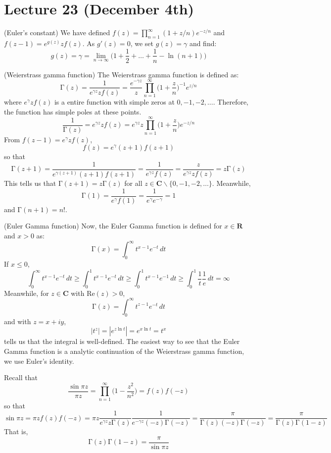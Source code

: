 \section{Lecture 23 (December 4th)}
\begin{recall}
(Euler's constant) We have defined $f(z)=\prod^{\infty }_{n=1}(1+z/n)e^{-z/n}$ and $f(z-1)=e^{g(z)}zf(z)$. As $g'(z)=0$, we set $g(z)=\gamma $ and find:
\[g(z)=\gamma =\lim _{n\rightarrow \infty }\Big(1+\dfrac{1}{2}+\ldots +\dfrac{1}{n}-\ln(n+1)\Big)\]
\end{recall}
\vspace{2ex}
\begin{defi}
(Weierstrass gamma function) The Weierstrass gamma function is defined as:
\[\mathrm{\Gamma}(z)=\dfrac{1}{e^{\gamma z }zf(z)}=\dfrac{e^{-\gamma z}}{z}\prod^{\infty }_{n=1}\Big(1+\dfrac{z}{n}\Big)^{-1}e^{z/n}\]
where $e^{\gamma }zf(z)$ is a entire function with simple zeros at $0,-1,-2,\ldots $. Therefore, the function has simple poles at these points. 
\[\dfrac{1}{\mathrm{\Gamma} (z)}=e^{\gamma z}zf(z)=e^{\gamma z}z\prod^{\infty }_{n=1}\Big(1+\dfrac{z}{n}\Big)e^{-z/n}\]
From $f(z-1)=e^{\gamma }zf(z)$,
\[f(z)=e^{\gamma }(z+1)f(z+1)\]
so that 
\[\mathrm{\Gamma} (z+1)=\dfrac{1}{e^{\gamma (z+1)}(z+1)f(z+1)}=\dfrac{1}{e^{\gamma z}f(z)}=\dfrac{z}{e^{\gamma z}zf(z)}=z\mathrm{\Gamma} (z)\]
This tells us that $\mathrm{\Gamma} (z+1)=z\mathrm{\Gamma} (z)$ for all $z\in {\bm C}\backslash \{0,-1,-2,\ldots \}$. Meanwhile,
\[\mathrm{\Gamma} (1)=\dfrac{1}{e^{\gamma }f(1)}=\dfrac{1}{e^{\gamma }e^{-\gamma }}=1\]
and $\mathrm{\Gamma} (n+1)=n!$.
\end{defi}
\vspace{2ex}
\begin{defi}
(Euler Gamma function) Now, the Euler Gamma function is defined for $x\in {\bm R}$ and $x>0$ as:
\[\mathrm{\Gamma} (x)=\int ^{\infty }_{0}t^{x-1}e^{-t}\,dt\]
If $x\leq 0$,
\[\int ^{\infty }_{0}t^{x-1}e^{-t}\,dt\geq \int ^{1}_{0}t^{x-1}e^{-t}\,dt\geq \int ^{1}_{0}t^{x-1}e^{-1}\,dt\geq \int ^{1}_{0}\dfrac{1}{t}\dfrac{1}{e}\,dt=\infty \]
Meanwhile, for $z\in {\bm C}$ with $\mathrm{Re}(z)>0$,
\[\mathrm{\Gamma} (z)=\int ^{\infty }_{0}t^{z-1}e^{-t}\,dt\]
and with $z=x+iy$,
\[|t^{z}|=|e^{z\ln t}|=e^{x\ln t}=t^{x}\]
tells us that the integral is well-defined. The easiest way to see that the Euler Gamma function is a analytic continuation of the Weierstrass gamma function, we use Euler's identity. 
\end{defi}
\vspace{2ex}
\begin{recall}
Recall that
\[\dfrac{\sin \pi z}{\pi z}=\prod^{\infty }_{n=1}\Big(1-\dfrac{z^2}{n^2}\Big)=f(z)f(-z)\]
so that 
\[\sin \pi z=\pi z f(z)f(-z)=\pi z\dfrac{1}{e^{\gamma z}z\mathrm{\Gamma} (z)}\dfrac{1}{e^{-\gamma z}(-z)\mathrm{\Gamma} (-z)}=\dfrac{\pi }{\mathrm{\Gamma} (z)(-z)\mathrm{\Gamma} (-z)}=\dfrac{\pi }{\mathrm{\Gamma} (z)\mathrm{\Gamma} (1-z)}\]
That is,
\[\mathrm{\Gamma} (z)\mathrm{\Gamma} (1-z)=\dfrac{\pi }{\sin \pi z}\]
\end{recall}
